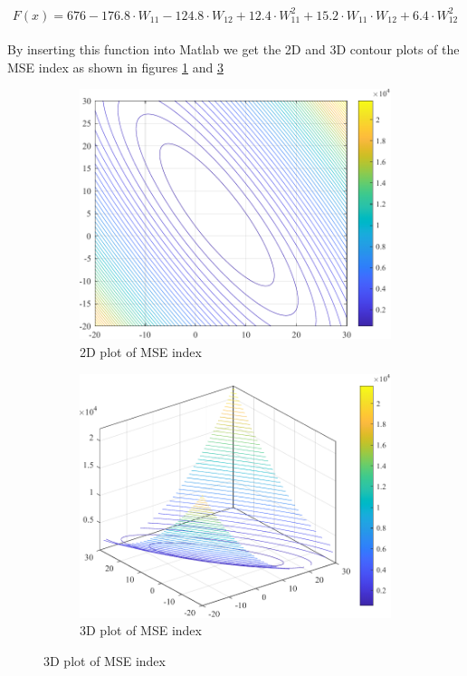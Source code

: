\[
F(x) = 676 -176.8 \cdot W_{11} - 124.8 \cdot W_{12} + 12.4 \cdot W_{11}^2 + 15.2 \cdot W_{11}\cdot W_{12} + 6.4 \cdot W_{12}^2
\]
\\
By inserting this function into Matlab we get the 2D and 3D contour plots of the MSE index
as shown in figures \ref{fig:prob_8_2d} and \ref{fig:prob_8_3d}
\begin{figure}[H]
	\centering
	\begin{subfigure}{0.47\textwidth}
		\centering
		\includegraphics[width=\textwidth]{../Problem 8/contour_2d.pdf}
		\caption{2D plot of MSE index}
		\label{fig:prob_8_2d}
	\end{subfigure}
	\hspace{2mm}
	\begin{subfigure}{0.47\textwidth}
		\centering
		\includegraphics[width=\textwidth]{../Problem 8/contour_3d.pdf}
		\caption{3D plot of MSE index}
		\label{fig:prob_8_3d}
	\end{subfigure}	
\end{figure}

